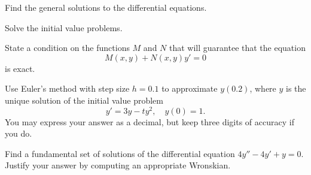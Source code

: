 \documentclass[11pt]{exam}
\begin{document}
\begin{questions}  

\question Find the general solutions to the differential equations.


\question Solve the initial value problems. 


\question[10] State a condition on the functions $M$ and $N$ that will guarantee that the equation
\[
    M(x, y) + N(x, y) y' = 0
\]
is exact.


\question[15] Use Euler's method with step size $h = 0.1$ to approximate $y(0.2)$, where $y$ is the unique solution of the initial value problem
\[
    y' = 3y - ty^2, \quad y(0) = 1.
\]
You may express your answer as a decimal, but keep three digits of accuracy if you do. 


\question[15] Find a fundamental set of solutions of the differential equation $4y'' - 4y' + y = 0$. Justify your answer by computing an appropriate Wronskian.

\end{questions}
\end{document}
